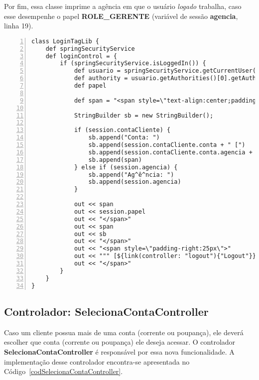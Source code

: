 Por fim, essa  classe imprime a agência em que o  usuário {\it logado} trabalha,
caso  esse desempenhe  o  papel  {\bf ROLE\_GERENTE}  (variável  de sessão  {\bf
  agencia}, linha 19).  

\begin{lstlisting}[caption=Biblioteca  de marca  {\bf  LoginTagLib}, frame=trBL,
    float=htbp, label=codTagLib2, numbers=left] 
class LoginTagLib {
    def springSecurityService
    def loginControl = {
        if (springSecurityService.isLoggedIn()) {
            def usuario = springSecurityService.getCurrentUser() 
            def authority = usuario.getAuthorities()[0].getAuthority()
            def papel
            
            def span = "<span style=\"text-align:center;padding-left:25px;padding-right:25px\">"
            
            StringBuilder sb = new StringBuilder();
            
            if (session.contaCliente) {
                sb.append("Conta: ")
                sb.append(session.contaCliente.conta + " [")
                sb.append(session.contaCliente.conta.agencia + "]")
                sb.append(span)
            } else if (session.agencia) { 
                sb.append("Ag^ê^ncia: ")
                sb.append(session.agencia)
            }
            
            out << span
            out << session.papel
            out << "</span>"
            out << span
            out << sb
            out << "</span>"
            out << "<span style=\"padding-right:25px\">"
            out << """ [${link(controller: "logout"){"Logout"}}]"""
            out << "</span>"
        }
    }
}
\end{lstlisting}

\subsection{Controlador: SelecionaContaController}\label{secSeleciona}

\vspace{0.5cm}

Caso um  cliente possua  mais de  uma conta (corrente  ou poupança),  ele deverá
escolher que  conta (corrente  ou poupança) ele  deseja acessar.   O controlador
{\bf SelecionaContaController}  é responsável  por essa nova  funcionalidade.  A
implementação      desse     controlador     encontra-se      apresentada     no
Código~\ref{codSelecionaContaController}.  

